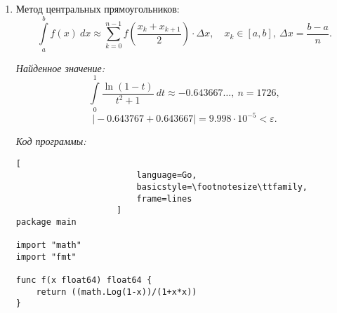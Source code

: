 \documentclass[14pt, a4paper, titlepage, fleqn]{extarticle}
\begin{document}
\begin{enumerate}
                    \pagebreak
                    \textit{Код программы:}
                    \begin{lstlisting}[
                        language=Go,
                        basicstyle=\footnotesize\ttfamily,
                        frame=lines
                    ]
package main

import "math"
import "fmt"

func f(x float64) float64 {
    return ((math.Log(1-x))/(1+x*x))
}

func right_rect(n int, a float64, b float64) float64 {
    s := 0.0
    delta := (b-a)/ float64(n)
    eps := 1e-5
    for i := 1; i <= n; i++ {
        if (i != n) {
            s += f(a + delta * float64(i))
        } else {
            s += f(a + delta * float64(i) - eps)
        }
    }
    s *= delta
    return s
}

func main() {
    n := 0
    eps := 1e-4
    a := 0.0
    b := 1.0
    real := -0.643767
    s := 10000
    n=0
    for math.Abs(real - s) >= eps {
        n++
        s = right_rect(n,a,b)
    }
    fmt.Println(s, n, math.Abs(real-s))
}
                    \end{lstlisting}
                    \pagebreak
                
                \item Метод центральных прямоугольников:
                    \[
                        \int\limits_a^b f(x) ~ dx \approx
                        \sum_{k=0}^{n-1} f\left( \frac{x_k + x_{k+1}}{2}\right)\cdot
                        \Delta x,
                        \quad x_k \in [a, b], ~ \Delta x = \frac{b-a}{n}.
                    \]

                    \textit{Найденное значение:}
                    \[
                        \int\limits_0^1 \frac{\ln(1-t)}{t^2+1} ~ dt \approx
                        -0.643667\dots, ~ n = 1726,
                    \]
                    \[
                        \vert-0.643767+0.643667\vert = 9.998 
                        \cdot 10^{-5} < \varepsilon.
                    \]

                    \pagebreak
                    \textit{Код программы:}
                    \begin{lstlisting}[
                        language=Go,
                        basicstyle=\footnotesize\ttfamily,
                        frame=lines
                    ]
package main

import "math"
import "fmt"

func f(x float64) float64 {
    return ((math.Log(1-x))/(1+x*x))
}


\end{lstlisting}
\end{enumerate}
\end{document}
